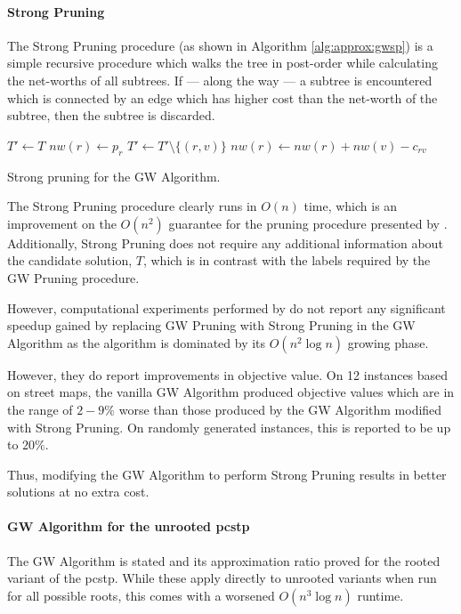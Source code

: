  \paragraph{Strong Pruning} The Strong Pruning procedure
 (as shown in Algorithm \ref{alg:approx:gwsp})
 is a simple recursive procedure which walks the tree in post-order while calculating the net-worths
 of all subtrees. If --- along the way --- a subtree is encountered which is connected by an
  edge which has higher cost than the net-worth of the subtree, then the subtree is discarded.
 \begin{algorithm}[h!]
   \begin{algorithmic}[1]
     \State $T' \gets T$
     \State $nw(r) \gets p_r$
     \State {}
     \State $T' \gets T' \setminus \{(r,v)\}$
     \Else
     \State $nw(r) \gets nw(r) + nw(v) - c_{rv}$
     \EndIf
     \EndFor
   \EndProcedure
 \end{algorithmic}
 \caption{Strong pruning for the GW Algorithm.}\label{alg:approx:gwsp}
\end{algorithm}

The Strong Pruning procedure clearly runs in $O(n)$ time, which is an improvement on the $O(n^2)$
guarantee for the pruning procedure presented by \citet{goemans1995general}. Additionally,
Strong Pruning does not require any additional information about the candidate solution, $T$,
which is in contrast with the labels required by the GW Pruning procedure.

However, computational experiments performed by \citet{Johnson:2000:PCS:338219.338637}
do not report any significant speedup gained by replacing GW Pruning with
Strong Pruning in the GW Algorithm
as the algorithm is dominated by its $O(n^2 \log n)$ growing phase.

However, they do report
improvements in objective value. On 12 instances based on street maps,
the vanilla GW Algorithm produced objective values which are in the range of $2-9\%$
worse than those produced by the GW Algorithm modified with Strong Pruning. On randomly
generated instances, this is reported to be up to $20\%$.

Thus, modifying the GW Algorithm to perform Strong Pruning results in better solutions at
 no extra cost.
\paragraph{GW  Algorithm for the unrooted \gls{pcstp}}
The GW Algorithm is stated and its approximation ratio proved
for the rooted variant of the \gls{pcstp}. While these apply directly to unrooted variants
when run for all possible roots, this comes with
a worsened $O(n^3 \log n)$ runtime.

